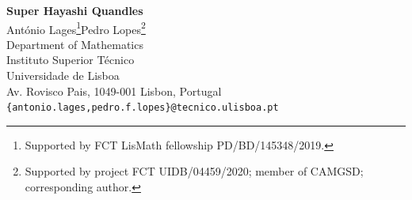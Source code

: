 \documentclass{article}
\begin{document}
\begin{center}

{\Large\textbf{Super Hayashi Quandles}} \\
\vspace{8px}
{\Large{Ant\'onio Lages\footnote{Supported by FCT LisMath fellowship PD/BD/145348/2019.}\qquad Pedro Lopes\footnote{Supported by project FCT UIDB/04459/2020; member of CAMGSD; corresponding author.}}} \\
\vspace{8px}
{\small{Department of Mathematics}} \\
{\small{Instituto Superior T\'ecnico}} \\
{\small{Universidade de Lisboa}} \\
{\small{Av. Rovisco Pais, 1049-001 Lisbon, Portugal}} \\
{\small{\texttt{\{antonio.lages,pedro.f.lopes\}@tecnico.ulisboa.pt}}} \\
\vspace{4px}
\end{center}


\pagestyle{plain}

\begin{abstract}
Quandles are right-invertible, right-self distributive (and idempotent) algebraic structures. Therefore,  right translations are automorphisms.
For each finite quandle, the list of the right translations' cycle structures is known as the profile of the quandle. For a connected quandle, any two right translations are conjugate so there is essentially one cycle structure per connected quandle - which we thus identify with the profile. Hayashi conjectured that, for a finite connected quandle, each length of its profile divides the longest length. In the present article we introduce Super Hayashi Quandles (SHQ). An SHQ is a finite connected quandle such that any two lengths in its profile are (i) distinct, and (ii) the shorter one divides the longer one. The SHQ's are latin quandles and we prove that their profiles depend only on the second shortest length and on the number of cycles, along with an explicit description of each of the lengths. Furthermore, we prove that SHQ's have SHQ's alone for subquandles (with the same second shortest length but fewer cycles). Finally, we construct infinitely many SHQ's.
\\
{\textcolor{white}{.}}\\
\textbf{Keywords}: quandle; right translation; cycle; profile; Hayashi conjecture; super Hayashi quandle.\\
\textbf{MSC2020}: 20N99.

\end{abstract}
\end{document}
